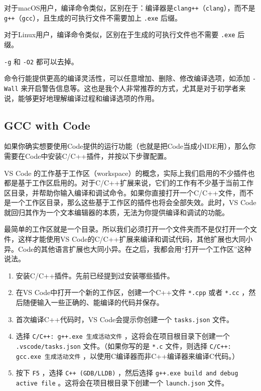 对于macOS用户，编译命令类似，区别在于：编译器是\texttt{clang++}（\texttt{clang}），而不是\texttt{g++}（\texttt{gcc}），且生成的可执行文件不需要加上 \verb|.exe| 后缀。

对于Linux用户，编译命令类似，区别在于生成的可执行文件也不需要 \verb|.exe| 后缀。

\texttt{-g} 和 \texttt{-O2} 都可以去掉。

命令行能提供更高的编译灵活性，可以任意增加、删除、修改编译选项，如添加 \texttt{-Wall} 来开启警告信息等。这也是我个人非常推荐的方式，尤其是对于初学者来说，能够更好地理解编译过程和编译选项的作用。

\subsection{GCC with Code}\label{sec:code-with-gcc} 

如果你确实想要使用Code提供的运行功能（也就是把Code当成小IDE用），那么你需要在Code中安装C/C++插件，并按以下步骤配置。

\begin{remark}{}
  VS Code 的工作基于工作区（workspace）的概念，实际上我们启用的不少插件也都是基于工作区启用的。对于C/C++扩展来说，它们的工作有不少基于当前工作区目录，并帮助你输入编译和调试命令。如果你直接打开一个C/C++文件，而不是一个工作区目录，那么这些基于工作区的插件也将会全部失效。此时，VS Code就回归其作为一个文本编辑器的本质，无法为你提供编译和调试的功能。

  最简单的工作区就是一个目录。所以我们必须打开一个文件夹而不是仅打开一个文件，这样才能使用VS Code的C/C++扩展来编译和调试代码，其他扩展也大同小异。Code的其他语言扩展也大同小异。在之后，我都会用“打开一个工作区”这种说法。
\end{remark}

\begin{enumerate}
  \item 安装C/C++插件。先前已经提到过安装哪些插件。
  \item 在VS Code中打开一个新的工作区，创建一个C++文件 \verb|*.cpp| 或者 \verb|*.cc| ，然后随便输入一些正确的、能编译的代码并保存。
  \item 首次编译C++代码时，VS Code会提示你创建一个 \verb|tasks.json| 文件。
  \item 选择 \verb|C/C++: g++.exe 生成活动文件| ，这将会在项目根目录下创建一个 \verb|.vscode/tasks.json| 文件。（如果你写的是 \verb|*.c| 文件，则选择 \verb|C/C++: gcc.exe 生成活动文件| ，以使用C编译器而非C++编译器来编译C代码。）
  \item 按下 \verb|F5| ，选择 \verb|C++ (GDB/LLDB)| ，然后选择 \verb|g++.exe build and debug active file| 。这将会在项目根目录下创建一个 \verb|launch.json| 文件。
\end{enumerate}

